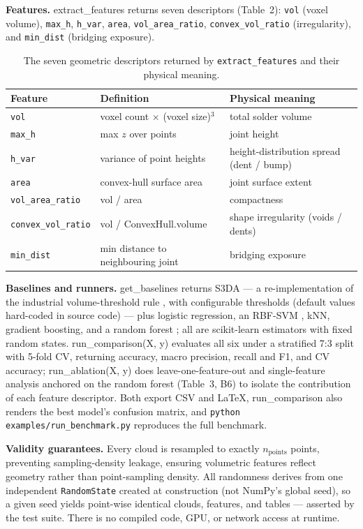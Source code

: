 \documentclass[3p]{elsarticle}
\begin{document}
\textbf{Features. }extract\_features returns seven descriptors (Table~2): \texttt{vol} (voxel volume), \texttt{max\_h}, \texttt{h\_var}, \texttt{area}, \texttt{vol\_area\_ratio}, \texttt{convex\_vol\_ratio} (irregularity), and \texttt{min\_dist} (bridging exposure).
\begin{table}[htbp]
\centering
\caption{The seven geometric descriptors returned by \texttt{extract\_features} and their physical meaning.}
\begin{tabular}{lll}
\toprule
\textbf{Feature} & \textbf{Definition} & \textbf{Physical meaning} \\
\midrule
\texttt{vol} & voxel count $\times$ (voxel size)$^3$ & total solder volume \\
\texttt{max\_h} & max $z$ over points & joint height \\
\texttt{h\_var} & variance of point heights & height-distribution spread (dent / bump) \\
\texttt{area} & convex-hull surface area & joint surface extent \\
\texttt{vol\_area\_ratio} & vol / area & compactness \\
\texttt{convex\_vol\_ratio} & vol / ConvexHull.volume & shape irregularity (voids / dents) \\
\texttt{min\_dist} & min distance to neighbouring joint & bridging exposure \\
\bottomrule
\end{tabular}
\end{table}
\textbf{Baselines and runners. }get\_baselines returns S3DA --- a re-implementation of the industrial volume-threshold rule \cite{ref6}, with configurable thresholds (default values hard-coded in source code) --- plus logistic regression, an RBF-SVM \cite{ref12}, kNN, gradient boosting, and a random forest \cite{ref11}; all are scikit-learn estimators \cite{ref13} with fixed random states. run\_comparison(X, y) evaluates all six under a stratified 7:3 split with 5-fold CV, returning accuracy, macro precision, recall and F1, and CV accuracy; run\_ablation(X, y) does leave-one-feature-out and single-feature analysis anchored on the random forest (Table~3, B6) to isolate the contribution of each feature descriptor. Both export CSV and LaTeX, run\_comparison also renders the best model's confusion matrix, and \texttt{python examples/run\_benchmark.py} reproduces the full benchmark.

\textbf{Validity guarantees. }Every cloud is resampled to exactly $n_{\mathrm{points}}$ points, preventing sampling-density leakage, ensuring volumetric features reflect geometry rather than point-sampling density. All randomness derives from one independent \texttt{RandomState} created at construction (not NumPy's global seed), so a given seed yields point-wise identical clouds, features, and tables --- asserted by the test suite. There is no compiled code, GPU, or network access at runtime.
\end{document}
